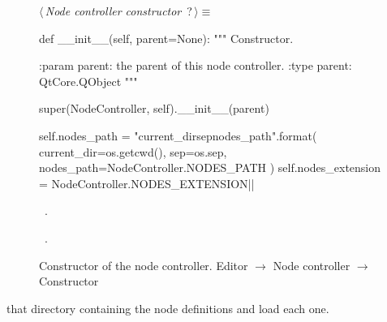 \documentclass[%
    a4paper,    %
    justified,  %
    nobib,      %
    openany     %
]{tufte-book}
\makeatletter
\renewcommand{\label}[1]{\@tufte@label{##1}}%
\makeatother
\begin{document}
\begin{figure}
\begin{flushleft} \small
\begin{minipage}{\linewidth}\label{scrap107}\raggedright\small
{} $\langle\,${\itshape Node controller constructor}\nobreak\ {\footnotesize {?}}$\,\rangle\equiv$
\vspace{-1ex}
\begin{pythoncode}
def __init__(self, parent=None):
    """ Constructor. 

    :param parent: the parent of this node controller.
    :type  parent: QtCore.QObject
    """

    super(NodeController, self).__init__(parent)

    self.nodes_path = "{current_dir}{sep}{nodes_path}".format(
        current_dir=os.getcwd(),
        sep=os.sep,
        nodes_path=NodeController.NODES_PATH
    )
    self.nodes_extension = NodeController.NODES_EXTENSION|\NWsep|
\end{pythoncode}
\vspace{1.5ex}
\footnotesize
\begin{list}{}{\setlength{\itemsep}{-\parsep}\setlength{\itemindent}{-\leftmargin}}
\item \NWtxtMacroDefBy\ .
\item \NWtxtMacroRefIn\ .

\item{}
\end{list}
\end{minipage}\vspace{4ex}
\end{flushleft}
\caption{Constructor of the node controller.
  \newline{}\newline{}Editor $\rightarrow$ Node controller $\rightarrow$
  Constructor}
\label{editor:lst:node-controller:constructor}
\end{figure}

 that directory containing the
node definitions and load each one.
\end{document}
